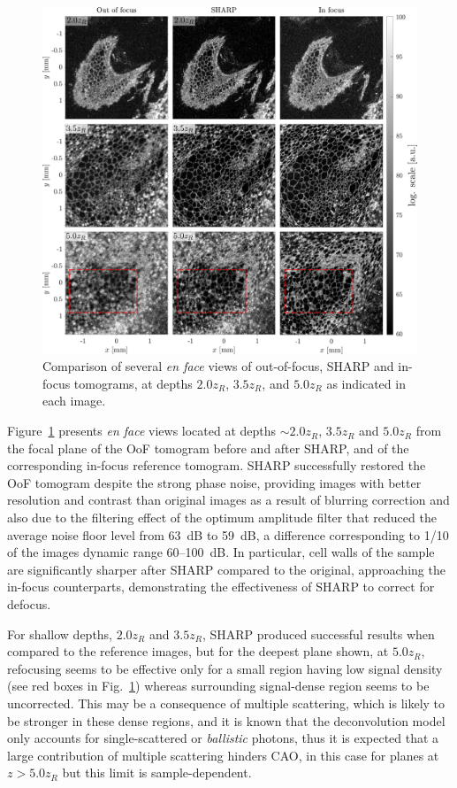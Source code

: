 \begin{figure}[htb!]
	\centering
	\includegraphics[width=\textwidth]{Figures/SHARP/SHARP_Cucumber_Enfaces.pdf}
	\caption[Comparison of several \textit{en face} views of out-of-focus, SHARP and in-focus tomograms.]{Comparison of several \textit{en face} views of out-of-focus, SHARP and in-focus tomograms, at depths $2.0z_R$, $3.5z_R$, and $5.0z_R$ as indicated in each image.}
	\label{fig:SHARP_CucumberEnfaces}
\end{figure}

Figure~\ref{fig:SHARP_CucumberEnfaces} presents \textit{en face} views located at depths $\sim 2.0z_R$, $3.5z_R$ and $5.0z_R$ from the focal plane of the OoF tomogram before and after SHARP, and of the corresponding in-focus reference tomogram. SHARP successfully restored the OoF tomogram despite the strong phase noise, providing images with better resolution and contrast than original images as a result of blurring correction and also due to the filtering effect of the optimum amplitude filter that reduced the average noise floor level from 63~dB to 59~dB, a difference corresponding to 1/10 of the images dynamic range 60--100~dB. In particular, cell walls of the sample are significantly sharper after SHARP compared to the original, approaching the in-focus counterparts, demonstrating the effectiveness of SHARP to correct for defocus.

For shallow depths, $2.0z_R$ and $3.5z_R$, SHARP produced successful results when compared to the reference images, but for the deepest plane shown, at $5.0z_R$, refocusing seems to be effective only for a small region having low signal density (see red boxes in Fig.~\ref{fig:SHARP_CucumberEnfaces}) whereas surrounding signal-dense region seems to be uncorrected. This may be a consequence of multiple scattering, which is likely to be stronger in these dense regions, and it is known that the deconvolution model only accounts for single-scattered or \textit{ballistic} photons, thus it is expected that a large contribution of multiple scattering hinders CAO, in this case for planes at $z>5.0z_R$ but this limit is sample-dependent.

